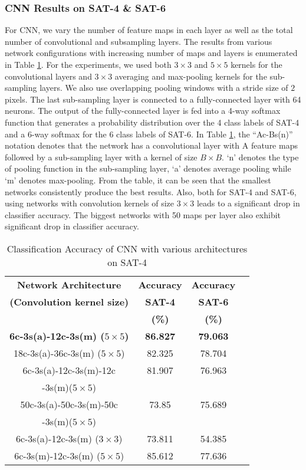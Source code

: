 \documentclass[11pt,a4paper]{article}
\begin{document}
\subsubsection{CNN Results on SAT-4 \& SAT-6}
For CNN, we vary the number of feature maps in each layer as well as the total number of convolutional and subsampling layers. The results from various network configurations with increasing number of maps and layers is enumerated in Table \ref{table:CNN_accuracy_SAT_4_and_SAT_6}. For the experiments, we used both $3{\times}3$ and $5{\times}5$ kernels for the convolutional layers and $3{\times}3$ averaging and max-pooling kernels for the sub-sampling layers. We also use overlapping pooling windows with a stride size of $2$ pixels. The last sub-sampling layer is connected to a fully-connected layer with 64 neurons. The output of the fully-connected layer is fed into a 4-way softmax function that generates a probability distribution over the 4 class labels of SAT-4 and a 6-way softmax for the 6 class labels of SAT-6. In Table \ref{table:CNN_accuracy_SAT_4_and_SAT_6}, the ``Ac-Bs(n)'' notation denotes that the network has a convolutional layer with A feature maps followed by a sub-sampling layer with a kernel of size $B{\times}B$. `n' denotes the type of pooling function in the sub-sampling layer, `a' denotes average pooling while `m' denotes max-pooling. From the table, it can be seen that the smallest networks consistently produce the best results. Also, both for SAT-4 and SAT-6, using networks with convolution kernels of size $3{\times}3$ leads to a significant drop in classifier accuracy. The biggest networks with 50 maps per layer also exhibit significant drop in classifier accuracy.   

\begin{table}[h!]
\centering
\begin{tabular}{ | c | c | c | c |}
    \hline
    \textbf{Network Architecture} & \textbf{Accuracy} & \textbf{Accuracy}\\   
     \textbf{(Convolution kernel size)} & \textbf{SAT-4} & \textbf{SAT-6} \\ 
     &\textbf{(\%)} & \textbf{(\%)}\\ \hline
    \textbf{6c-3s(a)-12c-3s(m) ($5{\times}5$)} & \textbf{86.827} & \textbf{79.063} \\ \hline
    18c-3s(a)-36c-3s(m) ($5{\times}5$) & 82.325 & 78.704\\ \hline
    6c-3s(a)-12c-3s(m)-12c & 81.907  & 76.963\\ 
    -3s(m)($5{\times}5$) & &\\ \hline
    50c-3s(a)-50c-3s(m)-50c & 73.85 & 75.689 \\ 
    -3s(m)($5{\times}5$) & &\\ \hline
    6c-3s(a)-12c-3s(m) ($3{\times}3$) & 73.811  & 54.385 \\ \hline
    6c-3s(m)-12c-3s(m) ($5{\times}5$) & 85.612  & 77.636 \\ \hline
  \end{tabular}
  \caption{Classification Accuracy of CNN with various architectures on SAT-4}
  \label{table:CNN_accuracy_SAT_4_and_SAT_6}
\end{table}     
\end{document}

